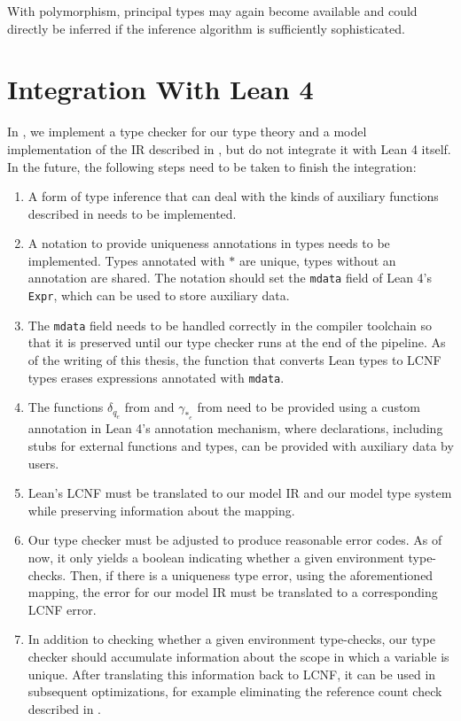With polymorphism, principal types may again become available and could directly be inferred if the inference algorithm is sufficiently sophisticated.

\section{Integration With Lean 4}
In , we implement a type checker for our type theory and a model implementation of the IR described in , but do not integrate it with Lean 4 itself. In the future, the following steps need to be taken to finish the integration:
\begin{enumerate}
	\item A form of type inference that can deal with the kinds of auxiliary functions described in  needs to be implemented.
	\item A notation to provide uniqueness annotations in types needs to be implemented. Types annotated with $*$ are unique, types without an annotation are shared. The notation should set the \lstinline|mdata| field of Lean 4's \lstinline|Expr|, which can be used to store auxiliary data.
	\item The \lstinline|mdata| field needs to be handled correctly in the compiler toolchain so that it is preserved until our type checker runs at the end of the pipeline. As of the writing of this thesis, the function that converts Lean types to LCNF types erases expressions annotated with \lstinline|mdata|.
	\item The functions $\delta_{q_e}$ from  and $\gamma_{*_e}$ from  need to be provided using a custom annotation in Lean 4's annotation mechanism, where declarations, including stubs for external functions and types, can be provided with auxiliary data by users.
	\item Lean's LCNF must be translated to our model IR and our model type system while preserving information about the mapping.
	\item Our type checker must be adjusted to produce reasonable error codes. As of now, it only yields a boolean indicating whether a given environment type-checks. Then, if there is a uniqueness type error, using the aforementioned mapping, the error for our model IR must be translated to a corresponding LCNF error.
	\item In addition to checking whether a given environment type-checks, our type checker should accumulate information about the scope in which a variable is unique. After translating this information back to LCNF, it can be used in subsequent optimizations, for example eliminating the reference count check described in .
\end{enumerate}

